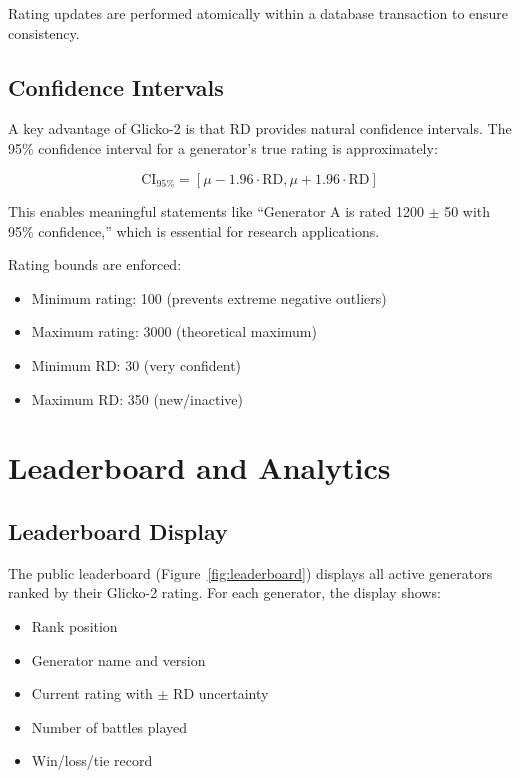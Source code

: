 \documentclass[11pt,a4paper]{article}
\theoremstyle{plain}
\theoremstyle{definition}
\theoremstyle{remark}
\begin{document}
Rating updates are performed atomically within a database transaction to ensure consistency.

\subsection{Confidence Intervals}
\label{subsec:confidence}

A key advantage of Glicko-2 is that RD provides natural confidence intervals. The 95\% confidence interval for a generator's true rating is approximately:

\begin{equation}
\text{CI}_{95\%} = [\mu - 1.96 \cdot \text{RD}, \mu + 1.96 \cdot \text{RD}]
\end{equation}

This enables meaningful statements like ``Generator A is rated 1200 $\pm$ 50 with 95\% confidence,'' which is essential for research applications.

Rating bounds are enforced:
\begin{itemize}
    \item Minimum rating: 100 (prevents extreme negative outliers)
    \item Maximum rating: 3000 (theoretical maximum)
    \item Minimum RD: 30 (very confident)
    \item Maximum RD: 350 (new/inactive)
\end{itemize}

\section{Leaderboard and Analytics}
\label{sec:leaderboard}

\subsection{Leaderboard Display}
\label{subsec:leaderboard-display}

The public leaderboard (Figure~\ref{fig:leaderboard}) displays all active generators ranked by their Glicko-2 rating. For each generator, the display shows:

\begin{itemize}
    \item Rank position
    \item Generator name and version
    \item Current rating with $\pm$ RD uncertainty
    \item Number of battles played
    \item Win/loss/tie record
\end{itemize}
\end{document}
